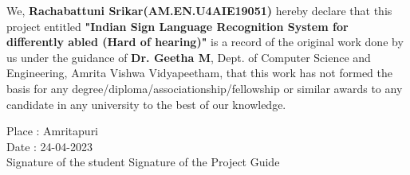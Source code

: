 \documentclass[oneside,12pt]{Classes/CUEDthesisPSnPDF}
\begin{document}
\vspace{1pt}

We, \textbf{Rachabattuni Srikar(AM.EN.U4AIE19051)} hereby declare that this project entitled \textbf{"Indian Sign Language Recognition System for differently abled (Hard of hearing)"} is a record of the original work done by us under the guidance of \textbf{Dr. Geetha M}, Dept. of Computer Science and Engineering, Amrita Vishwa Vidyapeetham, that this work has not formed the basis for any degree/diploma/associationship/fellowship or similar awards to any candidate in any university to the best of our knowledge.\\

\vspace{60pt}

\begin{flushleft}

	Place	:	Amritapuri\\[1ex]

	Date	:	24-04-2023\\[15ex]

	Signature of the student \hspace{90pt}	Signature of the Project Guide\\

\end{flushleft}

\setcounter{secnumdepth}{3}

\setcounter{tocdepth}{3}

\frontmatter %



\end{document}
